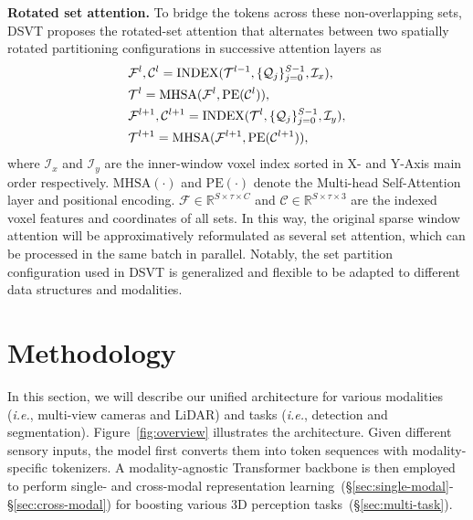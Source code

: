 \documentclass[10pt,twocolumn,letterpaper]{article}
\begin{document}
\noindent \textbf{Rotated set attention.} 
To bridge the tokens across these non-overlapping sets, DSVT proposes the rotated-set attention that alternates between two spatially rotated partitioning configurations in successive attention layers as
\vspace{-4pt}
\begin{equation}
    \begin{aligned}
    &\mathcal{F}^{l}, \mathcal{C}^{l} = \text{INDEX}(\mathcal{T}^{l-1}, \{\mathcal{Q}_j\}_{j=0}^{S-1}, \mathcal{I}_x), \\
    &\mathcal{T}^{l} = \text{MHSA}(\mathcal{F}^{l}, \text{PE}(\mathcal{C}^{l})), \\
    &\mathcal{F}^{l+1}, \mathcal{C}^{l+1} = \text{INDEX}(\mathcal{T}^{l}, \{\mathcal{Q}_j\}_{j=0}^{S-1}, \mathcal{I}_y), \\
    &\mathcal{T}^{l+1} = \text{MHSA}(\mathcal{F}^{l+1}, \text{PE}(\mathcal{C}^{l+1})), 
    \end{aligned}
\vspace{-4pt}
\end{equation}
where $\mathcal{I}_x$ and $\mathcal{I}_y$ are the inner-window voxel index sorted in X- and Y-Axis main order respectively. $\text{MHSA}(\cdot)$ and $\text{PE}(\cdot)$ denote the Multi-head Self-Attention layer and positional encoding. $\mathcal{F} \in \mathbb{R}^{S \times \tau \times C}$ and $\mathcal{C} \in \mathbb{R}^{S \times \tau \times 3}$ are the indexed voxel features and coordinates of all sets. In this way, the original sparse window attention will be approximatively reformulated as several set attention, which can be processed in the same batch in parallel. Notably, the set partition configuration used in DSVT is generalized and flexible to be adapted to different data structures and modalities.


\section{Methodology}
In this section, we will describe our unified architecture for various modalities (\textit{i.e.}, multi-view cameras and LiDAR) and tasks (\textit{i.e.}, detection and segmentation). Figure~\ref{fig:overview} illustrates the architecture. Given different sensory inputs, the model first converts them into token sequences with modality-specific tokenizers. A modality-agnostic Transformer backbone is then employed to perform single- and cross-modal representation learning~(\S\ref{sec:single-modal}-\S\ref{sec:cross-modal}) for boosting various 3D perception tasks~(\S\ref{sec:multi-task}).
\end{document}

